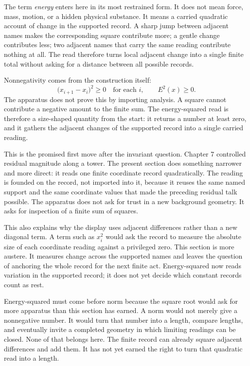 The term \emph{energy} enters here in its most restrained form. It does not
mean force, mass, motion, or a hidden physical substance. It means a carried
quadratic account of change in the supported record. A sharp jump between
adjacent names makes the corresponding square contribute more; a gentle change
contributes less; two adjacent names that carry the same reading contribute
nothing at all. The read therefore turns local adjacent change into a single
finite total without asking for a distance between all possible records.

Nonnegativity comes from the construction itself:
\[
  \bigl(x_{i+1}-x_i\bigr)^2 \ge 0
  \quad\text{for each } i,
  \qquad
  E^2(x) \ge 0 .
\]
The apparatus does not prove this by importing analysis. A square cannot
contribute a negative amount to the finite sum. The energy-squared read is
therefore a size-shaped quantity from the start: it returns a number at least
zero, and it gathers the adjacent changes of the supported record into a
single carried reading.

This is the promised first move after the invariant question. Chapter 7
controlled residual magnitude along a tower. The present section does something
narrower and more direct: it reads one finite coordinate record quadratically. The
reading is founded on the record, not imported into it, because it reuses the
same named support and the same coordinate values that made the preceding
residual talk possible. The apparatus does not ask for trust in a new
background geometry. It asks for inspection of a finite sum of squares.

This also explains why the display uses adjacent differences rather than a new
diagonal term. A term such as \(x_i^2\) would ask the record to measure the
absolute size of each coordinate reading against a privileged zero. This
section is more austere. It measures change across the supported names and
leaves the question of anchoring the whole record for the next finite act.
Energy-squared now reads variation in the supported record; it does not yet
decide which constant records count as rest.

Energy-squared must come before norm because the square root would ask for
more apparatus than this section has earned. A norm would not merely give a
nonnegative number. It would turn that number into a length, compare lengths,
and eventually invite a completed geometry in which limiting readings can be
closed. None of that belongs here. The finite record can already square
adjacent differences and add them. It has not yet earned the right to turn
that quadratic read into a length.

